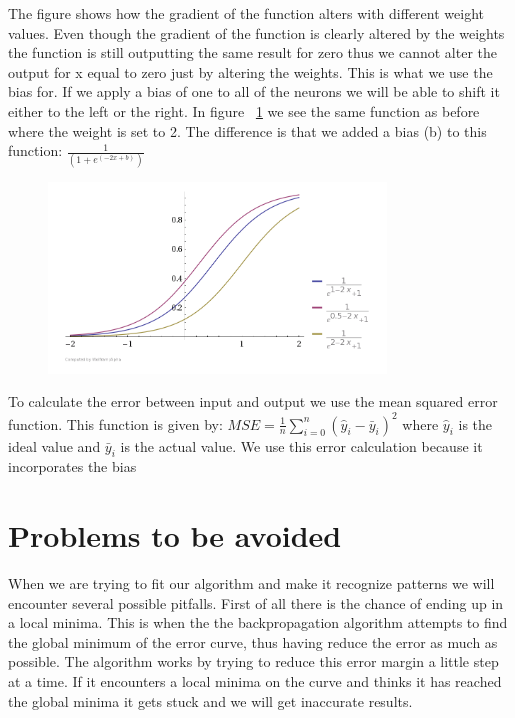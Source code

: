The figure shows how the gradient of the function alters with different weight values. Even though the gradient of the function is clearly altered by the weights the function is still outputting the same result for zero thus we cannot alter the output for x equal to zero just by altering the weights. This is what we use the bias for. If we apply a bias of one to all of the neurons we will be able to shift it either to the left or the right. In figure ~\ref{fig:activationFunctionsWithBias} we see the same function as before where the weight is set to 2. The difference is that we added a bias (b) to this function: \begin{math} \frac{1}{(1+e^{(-2x+b)})} \end{math} \cite[p. 165]{rojas1996neural} \cite{inductiveBias}

\begin{figure}[weight!]
\centering
\includegraphics[width=0.8\textwidth ,natwidth=410,natheight=237]{billeder/ActivationFunctionsWithBias.png}
\caption{}
\label{fig:activationFunctionsWithBias}
\end{figure}

To calculate the error between input and output we use the mean squared error function. This function is given by: \begin{math} MSE=\frac{1}{n}\sum_{i=0}^{n}(\hat{y}_i-\bar{y}_i)^2 \end{math} where \begin{math} \hat{y}_i \end{math} is the ideal value and \begin{math} \bar{y}_i \end{math} is the actual value. We use this error calculation because it incorporates the bias \cite{meanSquaredError}

\section{Problems to be avoided}
When we are trying to fit our algorithm and make it recognize patterns we will encounter several possible pitfalls. First of all there is the chance of ending up in a local minima. This is when the the backpropagation algorithm attempts to find the global minimum of the error curve, thus having reduce the error as much as possible. The algorithm works by trying to reduce this error margin a little step at a time. If it encounters a local minima on the curve and thinks it has reached the global minima it gets stuck and we will get inaccurate results. 

